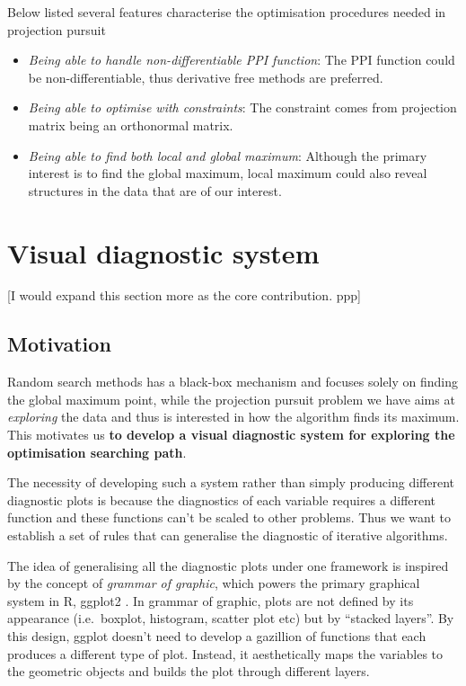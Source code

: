 \documentclass[12pt]{article}
\begin{document}
Below listed several features characterise the optimisation procedures
needed in projection pursuit

\begin{itemize}
\item
  \emph{Being able to handle non-differentiable PPI function}: The PPI
  function could be non-differentiable, thus derivative free methods are
  preferred.
\item
  \emph{Being able to optimise with constraints}: The constraint comes
  from projection matrix being an orthonormal matrix.
\item
  \emph{Being able to find both local and global maximum}: Although the
  primary interest is to find the global maximum, local maximum could
  also reveal structures in the data that are of our interest.
\end{itemize}

\hypertarget{vis-diag}{%
\section{Visual diagnostic system}\label{vis-diag}}

{[}I would expand this section more as the core contribution. ppp{]}

\hypertarget{motivation}{%
\subsection{Motivation}\label{motivation}}

Random search methods has a black-box mechanism and focuses solely on
finding the global maximum point, while the projection pursuit problem
we have aims at \emph{exploring} the data and thus is interested in how
the algorithm finds its maximum. This motivates us \textbf{to develop a
visual diagnostic system for exploring the optimisation searching path}.

The necessity of developing such a system rather than simply producing
different diagnostic plots is because the diagnostics of each variable
requires a different function and these functions can't be scaled to
other problems. Thus we want to establish a set of rules that can
generalise the diagnostic of iterative algorithms.

The idea of generalising all the diagnostic plots under one framework is
inspired by the concept of \emph{grammar of
graphic}\citep{wickham2010layered}, which powers the primary graphical
system in R, ggplot2 \citep{ggplot2}. In grammar of graphic, plots are
not defined by its appearance (i.e.~boxplot, histogram, scatter plot
etc) but by ``stacked layers''. By this design, ggplot doesn't need to
develop a gazillion of functions that each produces a different type of
plot. Instead, it aesthetically maps the variables to the geometric
objects and builds the plot through different layers.
\end{document}
